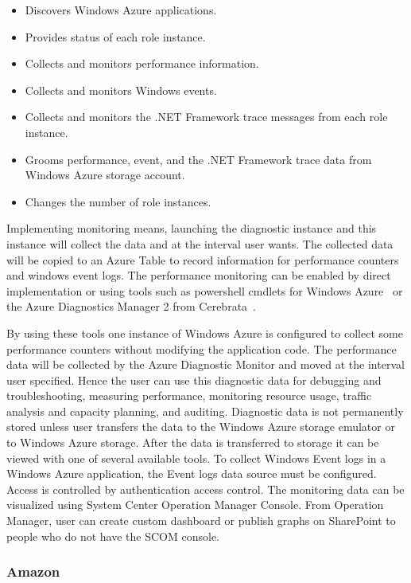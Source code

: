 \documentclass{sig-alternate-05-2015}
\begin{document}
\begin{itemize}
\setlength\itemsep{-2pt} 

 \item Discovers Windows Azure applications.
 \item Provides status of each role instance.
 \item Collects and monitors performance information.
 \item Collects and monitors Windows events.
 \item Collects and monitors the .NET Framework trace messages from each role instance.
 \item Grooms performance, event, and the .NET Framework trace data from Windows Azure storage account.
 \item Changes the number of role instances.
\end{itemize}

Implementing monitoring means, launching the diagnostic instance and
this instance will collect the data and at the interval user
wants. The collected data will be copied to an Azure Table to record
information for performance counters and windows event logs.  The
performance monitoring can be enabled by direct implementation or
using tools such as powershell cmdlets for Windows
Azure~\cite{cmdlets} or the Azure Diagnostics Manager 2 from
Cerebrata~\cite{cerebrata}.

By using these tools one instance of Windows Azure is configured to
collect some performance counters without modifying the application
code. The performance data will be collected by the Azure Diagnostic
Monitor and moved at the interval user specified. Hence the user can
use this diagnostic data for debugging and troubleshooting, measuring
performance, monitoring resource usage, traffic analysis and capacity
planning, and auditing. Diagnostic data is not permanently stored
unless user transfers the data to the Windows Azure storage emulator
or to Windows Azure storage. After the data is transferred to storage
it can be viewed with one of several available tools. To collect
Windows Event logs in a Windows Azure application, the Event logs data
source must be configured. Access is controlled by authentication
access control.  The monitoring data can be visualized using System
Center Operation Manager Console. From Operation Manager, user can
create custom dashboard or publish graphs on SharePoint to people who
do not have the SCOM console.

\subsubsection{Amazon}
\end{document}
